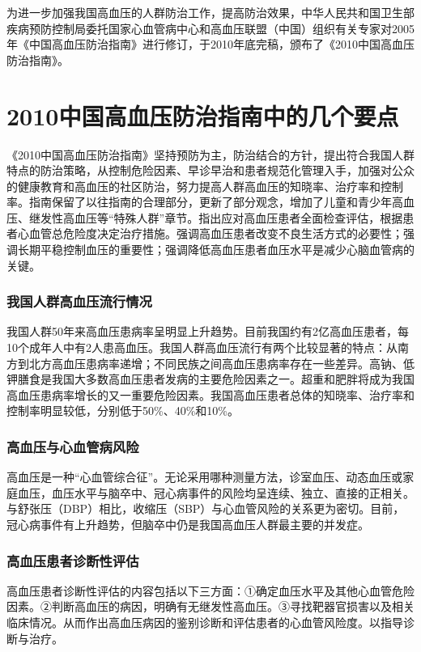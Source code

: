 为进一步加强我国高血压的人群防治工作，提高防治效果，中华人民共和国卫生部疾病预防控制局委托国家心血管病中心和高血压联盟（中国）组织有关专家对2005年《中国高血压防治指南》进行修订，于2010年底完稿，颁布了《2010中国高血压防治指南》。

\section{2010中国高血压防治指南中的几个要点}

《2010中国高血压防治指南》坚持预防为主，防治结合的方针，提出符合我国人群特点的防治策略，从控制危险因素、早诊早治和患者规范化管理入手，加强对公众的健康教育和高血压的社区防治，努力提高人群高血压的知晓率、治疗率和控制率。指南保留了以往指南的合理部分，更新了部分观念，增加了儿童和青少年高血压、继发性高血压等“特殊人群”章节。指出应对高血压患者全面检查评估，根据患者心血管总危险度决定治疗措施。强调高血压患者改变不良生活方式的必要性；强调长期平稳控制血压的重要性；强调降低高血压患者血压水平是减少心脑血管病的关键。

\subsubsection{我国人群高血压流行情况}

我国人群50年来高血压患病率呈明显上升趋势。目前我国约有2亿高血压患者，每10个成年人中有2人患高血压。我国人群高血压流行有两个比较显著的特点：从南方到北方高血压患病率递增；不同民族之间高血压患病率存在一些差异。高钠、低钾膳食是我国大多数高血压患者发病的主要危险因素之一。超重和肥胖将成为我国高血压患病率增长的又一重要危险因素。我国高血压患者总体的知晓率、治疗率和控制率明显较低，分别低于50\%、40\%和10\%。

\subsubsection{高血压与心血管病风险}

高血压是一种“心血管综合征”。无论采用哪种测量方法，诊室血压、动态血压或家庭血压，血压水平与脑卒中、冠心病事件的风险均呈连续、独立、直接的正相关。与舒张压（DBP）相比，收缩压（SBP）与心血管风险的关系更为密切。目前，冠心病事件有上升趋势，但脑卒中仍是我国高血压人群最主要的并发症。

\subsubsection{高血压患者诊断性评估}

高血压患者诊断性评估的内容包括以下三方面：①确定血压水平及其他心血管危险因素。②判断高血压的病因，明确有无继发性高血压。③寻找靶器官损害以及相关临床情况。从而作出高血压病因的鉴别诊断和评估患者的心血管风险度。以指导诊断与治疗。

